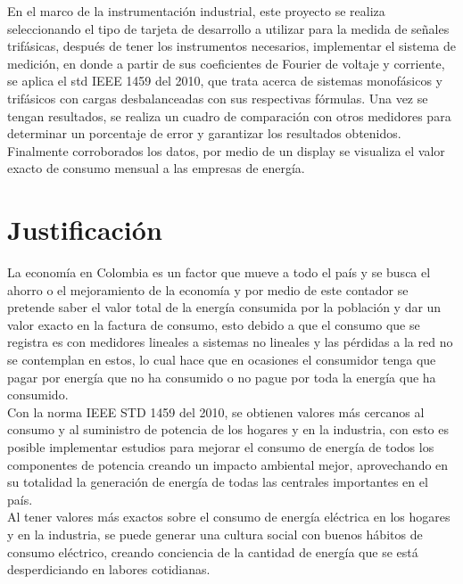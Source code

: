 En el marco de la instrumentación industrial, este proyecto se realiza seleccionando el tipo de tarjeta de desarrollo a utilizar para la medida de señales trifásicas, después de tener los instrumentos necesarios, implementar el sistema de medición, en donde a partir de sus coeficientes de Fourier de voltaje y corriente, se aplica el std IEEE 1459 del 2010, que trata acerca de sistemas monofásicos y trifásicos con cargas desbalanceadas con sus respectivas fórmulas. Una vez se tengan resultados, se realiza un cuadro de comparación con otros medidores para determinar un porcentaje de error y garantizar los resultados obtenidos. Finalmente corroborados los datos, por medio de un display se visualiza el valor exacto de consumo mensual a las empresas de energía. \\



\newpage{\clearpage}
\chapter{Justificación}

La economía en Colombia es un factor que mueve a todo el país y se busca el ahorro o el mejoramiento de la economía y por medio de este contador se pretende saber el valor total de la energía consumida por la población y dar un valor exacto en la factura de  consumo, esto debido a que el consumo que se registra es con medidores lineales a sistemas no lineales y las pérdidas a la red no se contemplan en estos, lo cual hace que en ocasiones el consumidor tenga que pagar por energía que no ha consumido o no pague por toda la energía que ha consumido.\\

Con la norma IEEE STD 1459 del 2010, se obtienen valores más cercanos al consumo y al suministro de potencia de los hogares y en la industria, con esto es posible implementar estudios para mejorar el consumo de energía de todos los componentes de potencia creando un impacto ambiental mejor, aprovechando en su totalidad la generación de energía de todas las centrales importantes en el país.\\
 
Al tener valores más exactos sobre el consumo de energía eléctrica en los hogares y en la industria, se puede generar una cultura social con buenos hábitos de consumo eléctrico, creando conciencia de la cantidad de energía que se está desperdiciando en labores cotidianas.\\

